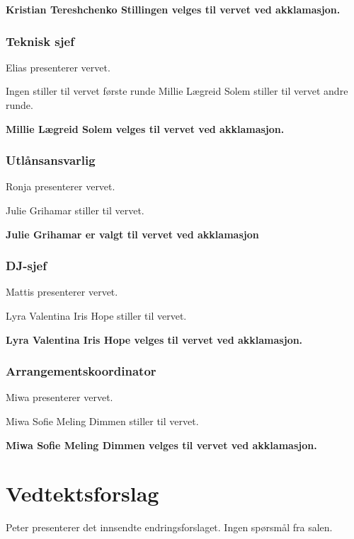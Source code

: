 \documentclass[10pt,norsk,a4paper,usenames,dvipsnames]{article}
\begin{document}
\begin{multicols}{2}
         \textbf{Kristian Tereshchenko Stillingen velges til vervet ved akklamasjon.}

         
        \subsubsection{Teknisk sjef}
        Elias presenterer vervet. 


        Ingen stiller til vervet første runde
        Millie Lægreid Solem stiller til vervet andre runde.

        \textbf{Millie Lægreid Solem velges til vervet ved akklamasjon.}
        
        
        \subsubsection{Utlånsansvarlig}
        Ronja presenterer vervet. 

        Julie Grihamar stiller til vervet.
        
        \textbf{Julie Grihamar er valgt til vervet ved akklamasjon}
        
        \subsubsection{DJ-sjef}
        Mattis presenterer vervet. 

        Lyra Valentina Iris Hope stiller til vervet. 
        

        \textbf{Lyra Valentina Iris Hope velges til vervet ved akklamasjon.}        
        
        \subsubsection{Arrangementskoordinator}
            Miwa presenterer vervet. 

             Miwa Sofie Meling Dimmen stiller til vervet. 
             
        \textbf{Miwa Sofie Meling Dimmen velges til vervet ved akklamasjon.}

\end{multicols}    
    
\section{Vedtektsforslag}

     Peter presenterer det innsendte endringsforslaget. Ingen spørsmål fra salen.    
\end{document}
